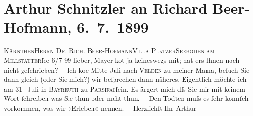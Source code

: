 

         
         \newcommand{\erwaehntePersonen}{Personen: Richard Beer-Hofmann, Oskar Mayer, Louise Schnitzler}
         \newcommand{\erwaehnteInstitutionen}{}
         \newcommand{\erwaehnteOrte}{Orte: Bayreuth, I., Innere Stadt, Kärnten, Seeboden, Velden am Wörthersee, Villa Platzer, Wien}
         \newcommand{\erwaehnteWerke}{Werke: Parsifal}
               \section[Arthur Schnitzler an Richard Beer-Hofmann, 6. 7. 1899]{ Arthur Schnitzler an Richard Beer-Hofmann, 6. 7. 1899}\nopagebreak{}\rehead{ }\begin{ledgroupsized}[t]{13cm}\normalsize\beginnumbering \toendnotes[C]{\smallbreak\pagebreak[2]} 
\toendnotes[C]{\smallbreak}\pstart{}{\pb}\textsc{Kärnthen}\pend{}\pstart{}\textsc{Herrn Dr. Rich. Beer-Hofmann}\pend{}\pstart{}\textsc{Villa Platzer}\pend{}\pstart{}\textsc{Seeboden am Millstätter}ſee\pend{}{\bigskip}\pstart
           \raggedleft{}{\pb}6/7 99\pend
           \pstart
           lieber, Mayer ko{\geminationm}t ja
               keineswegs mit; hat ers Ihnen noch nicht geſchrieben?\pend
           \pstart
           – Ich ko{\geminationm}e Mitte Juli nach \textsc{Velden} zu meiner Mama, beſuch
               Sie dann gleich (oder Sie mich?) wir beſprechen dann näheres.\pend
           \pstart
           Eigentlich möchte ich am {\pb}31. Juli in \textsc{Bayreuth} zu \textsc{Parsifal}ſein.\pend
           \pstart
           Es ärgert mich dſs Sie mir mit keinem Wort ſchreiben was Sie thun oder nicht
               thun.\pend
           \pstart
           – Den Todten muſs es ſehr komiſch vorkommen, was wir »Erleben« nennen. – \pend
           \pstart Herzlichſt Ihr \spacefill\mbox{Arthur}\pend{}
         
         \endnumbering{}\end{ledgroupsized}  \newcommand{\dateiname}{L00933}\newcommand{\titel}{Arthur Schnitzler an Richard Beer-Hofmann, 6. 7. 1899}\newcommand{\editorInnen}{Martin Anton Müller und Gerd-Hermann Susen}
      